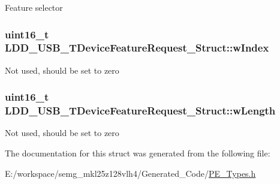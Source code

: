 Feature selector \hypertarget{struct_l_d_d___u_s_b___t_device_feature_request___struct_a261267b70741fe26898665df42fec10b}{
\subsubsection[{w\-Index}]{\setlength{\rightskip}{0pt plus 5cm}uint16\-\_\-t L\-D\-D\-\_\-\-U\-S\-B\-\_\-\-T\-Device\-Feature\-Request\-\_\-\-Struct\-::w\-Index}}\label{struct_l_d_d___u_s_b___t_device_feature_request___struct_a261267b70741fe26898665df42fec10b}
Not used, should be set to zero \hypertarget{struct_l_d_d___u_s_b___t_device_feature_request___struct_af0c222aa4585a132b2582fb1c290edc7}{
\subsubsection[{w\-Length}]{\setlength{\rightskip}{0pt plus 5cm}uint16\-\_\-t L\-D\-D\-\_\-\-U\-S\-B\-\_\-\-T\-Device\-Feature\-Request\-\_\-\-Struct\-::w\-Length}}\label{struct_l_d_d___u_s_b___t_device_feature_request___struct_af0c222aa4585a132b2582fb1c290edc7}
Not used, should be set to zero 

The documentation for this struct was generated from the following file\-:\begin{DoxyCompactItemize}
\item 
E\-:/workspace/semg\-\_\-mkl25z128vlh4/\-Generated\-\_\-\-Code/\hyperlink{_p_e___types_8h}{P\-E\-\_\-\-Types.\-h}\end{DoxyCompactItemize}
